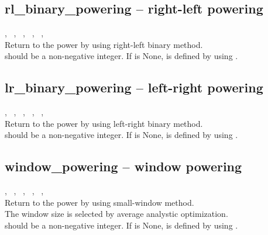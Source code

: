   \subsection{rl\_binary\_powering -- right-left powering}
   {%
     ,\ %
     ,\ %
     ,\ %
     ,\ %
     ,\ %
   }{%
   }\\
   \spacing
   \quad Return  to the  power by using right-left binary method.\\
   \spacing
   \quad  {} should be a non-negative integer.
   If  is None,  is defined by using .\\
%
  \subsection{lr\_binary\_powering -- left-right powering}
   {%
     ,\ %
     ,\ %
     ,\ %
     ,\ %
     ,\ %
   }{%
   }\\
   \spacing
   \quad Return  to the  power by using left-right binary method.\\
   \spacing
   \quad  {} should be a non-negative integer.
   If  is None,  is defined by using .\\
%
  \subsection{window\_powering -- window powering}
   {%
     ,\ %
     ,\ %
     ,\ %
     ,\ %
     ,\ %
   }{%
   }\\
   \spacing
   \quad Return  to the  power by using small-window method.\\
   \spacing
   \quad The window size is selected by average analystic optimization.\\
   \spacing
   \quad  {} should be a non-negative integer.
   If  is None,  is defined by using .\\
%

